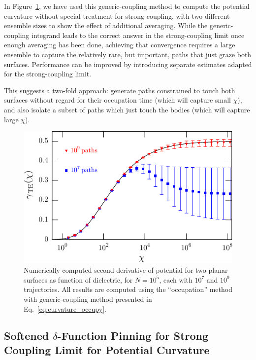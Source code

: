 In Figure~\ref{fig:curvature_a}, we have used this generic-coupling method to compute the potential curvature
without special treatment for strong coupling, with two different ensemble sizes to show the effect of additional averaging.  
While the generic-coupling integrand leads to the correct answer in the strong-coupling limit once enough
averaging has been done, achieving that convergence requires a large ensemble to capture the relatively rare, but important,
 paths that just graze both surfaces.
Performance can be improved by introducing separate estimates adapted for the strong-coupling limit.  

This suggests a two-fold approach: generate paths constrained to touch both surfaces without regard for their
occupation time (which will capture small $\chi$), and also isolate a subset of paths which just touch the 
bodies (which will capture large $\chi$).  

\begin{figure}
  \centering
  \includegraphics[width=0.8\columnwidth]{fig/numerics/curvature_a}
  \caption[Numerical TE Potential Curvature for two planar surfaces, evaluated with occupation method]{
    Numerically computed second derivative of potential for two planar surfaces as function 
    of dielectric, for $N=10^5$, each with $10^7$ and $10^9$ trajectories.  
    All results are computed using the ``occupation'' method with generic-coupling method presented in Eq.~\ref{eq:curvature_occupy}.}
\label{fig:curvature_a}
\end{figure}

\subsection{Softened $\delta$-Function Pinning for Strong Coupling Limit for Potential Curvature}

